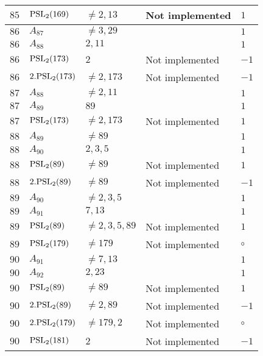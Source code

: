 \documentclass[a4paper, 11pt]{article}
\begin{document}
\begin{longtable}{lllll}
        $ 85 $ & $ {\rm PSL}_{2}(169) $ & $ \neq 2, 13 $ & Not implemented & $ 1  $ \\ \hline
        $ 86 $ & $ A_{87} $ & $ \neq 3, 29 $ & $ ~ $ & $ 1  $ \\ \hline
        $ 86 $ & $ A_{88} $ & $ 2, 11 $ & $ ~ $ & $ 1  $ \\ \hline
        $ 86 $ & $ {\rm PSL}_{2}(173) $ & $ 2 $ & Not implemented & $ -1  $ \\ \hline
        $ 86 $ & $ 2.{\rm PSL}_{2}(173) $ & $ \neq 2, 173 $ & Not implemented & $ -1  $ \\ \hline
        $ 87 $ & $ A_{88} $ & $ \neq 2, 11 $ & $ ~ $ & $ 1  $ \\ \hline
        $ 87 $ & $ A_{89} $ & $ 89 $ & $ ~ $ & $ 1  $ \\ \hline
        $ 87 $ & $ {\rm PSL}_{2}(173) $ & $ \neq 2, 173 $ & Not implemented & $ 1  $ \\ \hline
        $ 88 $ & $ A_{89} $ & $ \neq 89 $ & $ ~ $ & $ 1  $ \\ \hline
        $ 88 $ & $ A_{90} $ & $ 2, 3, 5 $ & $ ~ $ & $ 1  $ \\ \hline
        $ 88 $ & $ {\rm PSL}_{2}(89) $ & $ \neq 89 $ & Not implemented & $ 1  $ \\ \hline
        $ 88 $ & $ 2.{\rm PSL}_{2}(89) $ & $ \neq 89 $ & Not implemented & $ -1  $ \\ \hline
        $ 89 $ & $ A_{90} $ & $ \neq 2, 3, 5 $ & $ ~ $ & $ 1  $ \\ \hline
        $ 89 $ & $ A_{91} $ & $ 7, 13 $ & $ ~ $ & $ 1  $ \\ \hline
        $ 89 $ & $ {\rm PSL}_{2}(89) $ & $ \neq 2, 3, 5, 89 $ & Not implemented & $ 1  $ \\ \hline
        $ 89 $ & $ {\rm PSL}_{2}(179) $ & $ \neq 179 $ & Not implemented & $\circ$ \\ \hline
        $ 90 $ & $ A_{91} $ & $ \neq 7, 13 $ & $ ~ $ & $ 1  $ \\ \hline
        $ 90 $ & $ A_{92} $ & $ 2, 23 $ & $ ~ $ & $ 1  $ \\ \hline
        $ 90 $ & $ {\rm PSL}_{2}(89) $ & $ \neq 89 $ & Not implemented & $ 1  $ \\ \hline
        $ 90 $ & $ 2.{\rm PSL}_{2}(89) $ & $ \neq 2, 89 $ & Not implemented & $ -1  $ \\ \hline
        $ 90 $ & $ 2.{\rm PSL}_{2}(179) $ & $ \neq 179, 2 $ & Not implemented & $\circ$ \\ \hline
        $ 90 $ & $ {\rm PSL}_{2}(181) $ & $ 2 $ & Not implemented & $ -1  $ \\ \hline

\end{longtable}
\end{document}
